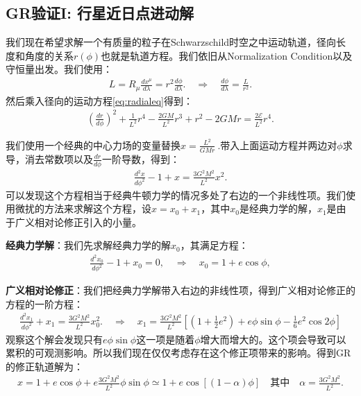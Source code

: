 \subsection{GR验证I: 行星近日点进动解}

\bigskip
{}

我们现在希望求解一个有质量的粒子在Schwarzschild时空之中运动轨道，径向长度和角度的关系$ r(\phi)
$也就是轨道方程。我们依旧从Normalization Condition以及守恒量出发。我们使用：
\begin{align}
  L=R_\mu\frac{dx^\mu}{d\lambda}=r^2\frac{d\phi}{d\lambda}. \quad
  \Rightarrow \quad \frac{d\phi}{d\lambda}=\frac{L}{r^2}.
\end{align}
然后乘入径向的运动方程\cref{eq:radialeq}得到：
\begin{align}
  \left(\frac{dr}{d\phi}\right)^2+\frac{1}{L^2}r^4-\frac{2GM}{L^2}r^3+r^2-2GMr=\frac{2\mathcal{E}}{L^2}r^4.
\end{align}

\bigskip
{}

我们使用一个经典的中心力场的变量替换$ x=\frac{L^2}{GMr}\mathrm{~.} $带入上面运动方程并两边对$ \phi
$求导，消去常数项以及$ \frac{d r}{d \phi} $一阶导数，得到：
\begin{align}
  \frac{d^2x}{d\phi^2}-1+x=\frac{3G^2M^2}{L^2}x^2.
\end{align}
可以发现这个方程相当于经典牛顿力学的情况多处了右边的一个非线性项。我们使用微扰的方法来求解这个方程，设$ x = x_0 + x_1
$，其中$ x_0 $是经典力学的解，$ x_1 $是由于广义相对论修正引入的小量。

\textbf{经典力学解}：我们先求解经典力学的解$ x_0 $，其满足方程：
\begin{align}
  \frac{d^2x_0}{d\phi^2}-1+x_0=0, \quad \Rightarrow \quad x_0 = 1 + e \cos\phi,
\end{align}

\textbf{广义相对论修正}：我们把经典力学解带入右边的非线性项，得到广义相对论修正的方程的一阶方程：
\begin{align}
  \frac{d^2x_1}{d\phi^2}+x_1=\frac{3G^2M^2}{L^2}x_0^2. \quad
  \Rightarrow \quad
  x_1=\frac{3G^2M^2}{L^2}\left[\left(1+\frac{1}{2}e^2\right)+e\phi\sin\phi-\frac{1}{6}e^2\cos2\phi\right]
\end{align}
观察这个解会发现只有$ e\phi\sin\phi $这一项是随着$ \phi
$增大而增大的。这个项会导致可以累积的可观测影响。所以我们现在仅仅考虑存在这个修正项带来的影响。得到GR的修正轨道解为：
\begin{align}
  x=1+e\cos\phi+e\frac{3G^2M^2}{L^2}\phi\sin\phi\simeq1+e\cos\left[(1-\alpha)\phi\right]
  \quad \text{其中} \quad \alpha=\frac{3G^2M^2}{L^2}.
\end{align}

